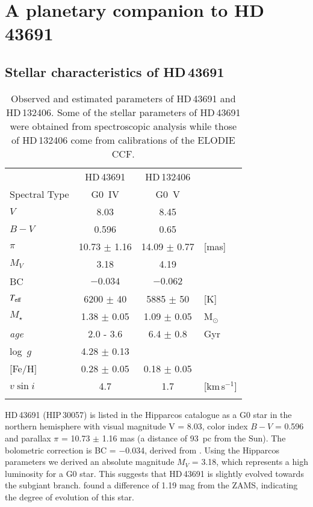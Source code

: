 \documentclass{aa}
\begin{document}
\section{A planetary companion to HD\,43691}
\label{star_par1}
\subsection{Stellar characteristics of HD\,43691}
\label{star_car1}

\begin{table}[t!]
\centering
  \caption[]{Observed and estimated parameters of HD\,43691 and HD\,132406.
             Some of the stellar parameters of HD\,43691 were obtained from
	     spectroscopic analysis while those of HD\,132406 come from
	     calibrations of the ELODIE CCF.}
  \label{stellar_par}
\begin{tabular}{lccl}
\hline
\hline
\noalign{\smallskip}
              & HD\,43691        & HD\,132406       &		     \\
\noalign{\smallskip}
\hline
\noalign{\smallskip}
Spectral Type & G0~IV            & G0~V		    &		     \\
$V$           & 8.03             & 8.45 	    &		     \\
$B-V$         & 0.596            & 0.65 	    &		     \\
$\pi$         & 10.73 $\pm$ 1.16 & 14.09 $\pm$ 0.77 & [mas]	     \\
$M_V$         & 3.18             & 4.19 	    &		     \\
BC            & $-0.034$         & $-0.062$	    &		     \\
$T_{\rm eff}$ & 6200 $\pm$ 40    & 5885 $\pm$ 50    & [K]	     \\
$M_\star$     & 1.38 $\pm$ 0.05  & 1.09 $\pm$ 0.05  & M$_{\odot}$    \\
{\it age}     & 2.0 - 3.6        & 6.4  $\pm$ 0.8   & Gyr	     \\
log~$g$       & 4.28 $\pm$ 0.13  &                  &                \\
$[$Fe/H$]$    & 0.28 $\pm$ 0.05  & 0.18 $\pm$ 0.05  &		     \\
$v{\sin i}$   & 4.7              & 1.7  	    & [km\,s$^{-1}$] \\
\noalign{\smallskip}
\hline
\end{tabular}
\end{table}


HD\,43691 (HIP\,30057) is listed in the Hipparcos catalogue \citep{ESA1997} 
as a G0 star in the northern hemisphere with visual magnitude V = 8.03,
color index $B-V$ = 0.596 and parallax $\pi$ = 10.73 $\pm$ 1.16 mas (a
distance of 93~pc from the Sun). The bolometric correction is BC = $-$0.034,
derived from \citet{Flower1996}. Using the Hipparcos parameters we derived
an absolute magnitude $M_V$ = 3.18, which represents a high luminosity for a
G0 star. This suggests that HD\,43691 is slightly evolved towards the
subgiant branch. \citet{Nordstrometal2004} found a difference of 1.19 mag
from the ZAMS, indicating the degree of evolution of this star.
\end{document}
